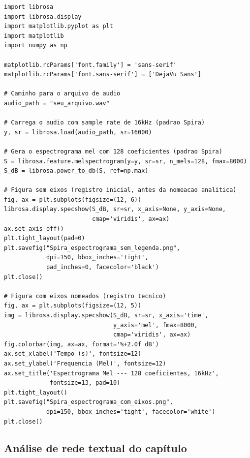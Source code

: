 \begin{lstlisting}[caption={Código \texttt{Python} para geração dos espectrogramas mel no padrão \texttt{Spira} \parencite{Casanova2021DeepLearning,Gauy2024Discriminant}.}, label={lst:espectrograma}]
import librosa
import librosa.display
import matplotlib.pyplot as plt
import matplotlib
import numpy as np

matplotlib.rcParams['font.family'] = 'sans-serif'
matplotlib.rcParams['font.sans-serif'] = ['DejaVu Sans']

# Caminho para o arquivo de audio
audio_path = "seu_arquivo.wav"

# Carrega o audio com sample rate de 16kHz (padrao Spira)
y, sr = librosa.load(audio_path, sr=16000)

# Gera o espectrograma mel com 128 coeficientes (padrao Spira)
S = librosa.feature.melspectrogram(y=y, sr=sr, n_mels=128, fmax=8000)
S_dB = librosa.power_to_db(S, ref=np.max)

# Figura sem eixos (registro inicial, antes da nomeacao analitica)
fig, ax = plt.subplots(figsize=(12, 6))
librosa.display.specshow(S_dB, sr=sr, x_axis=None, y_axis=None,
                         cmap='viridis', ax=ax)
ax.set_axis_off()
plt.tight_layout(pad=0)
plt.savefig("Spira_espectrograma_sem_legenda.png",
            dpi=150, bbox_inches='tight',
            pad_inches=0, facecolor='black')
plt.close()

# Figura com eixos nomeados (registro tecnico)
fig, ax = plt.subplots(figsize=(12, 5))
img = librosa.display.specshow(S_dB, sr=sr, x_axis='time',
                               y_axis='mel', fmax=8000,
                               cmap='viridis', ax=ax)
fig.colorbar(img, ax=ax, format='%+2.0f dB')
ax.set_xlabel('Tempo (s)', fontsize=12)
ax.set_ylabel('Frequencia (Mel)', fontsize=12)
ax.set_title('Espectrograma Mel --- 128 coeficientes, 16kHz',
             fontsize=13, pad=10)
plt.tight_layout()
plt.savefig("Spira_espectrograma_com_eixos.png",
            dpi=150, bbox_inches='tight', facecolor='white')
plt.close()
\end{lstlisting}

\subsection{Análise de rede textual do capítulo}
\label{sec:analise-rede-textual-cap4}

